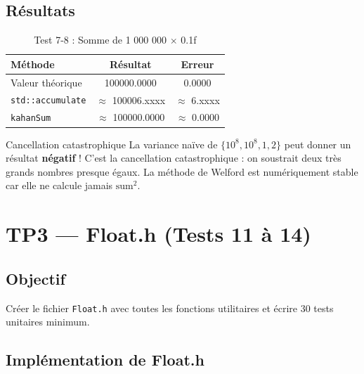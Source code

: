 \documentclass[12pt,a4paper]{report}
\begin{document}
\subsection{Résultats}

\begin{table}[H]
    \centering
    \begin{tabular}{|l|c|c|}
        \hline
        \textbf{Méthode} & \textbf{Résultat} & \textbf{Erreur} \\
        \hline
        Valeur théorique & 100000.0000 & 0.0000 \\
        \texttt{std::accumulate} & $\approx$ 100006.xxxx & $\approx$ 6.xxxx \\
        \texttt{kahanSum} & $\approx$ 100000.0000 & $\approx$ 0.0000 \\
        \hline
    \end{tabular}
    \caption{Test 7-8 : Somme de 1 000 000 $\times$ 0.1f}
\end{table}

\begin{warningbox}{Cancellation catastrophique}
La variance naïve de $\{10^8, 10^8, 1, 2\}$ peut donner un résultat
\textbf{négatif} ! C'est la cancellation catastrophique : on soustrait
deux très grands nombres presque égaux. La méthode de Welford est
numériquement stable car elle ne calcule jamais $\text{sum}^2$.
\end{warningbox}

\section{TP3 --- Float.h (Tests 11 à 14)}

\subsection{Objectif}

Créer le fichier \texttt{Float.h} avec toutes les fonctions utilitaires
et écrire 30 tests unitaires minimum.

\subsection{Implémentation de Float.h}
\end{document}
